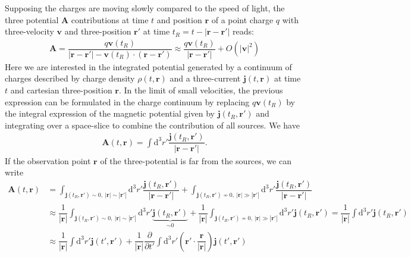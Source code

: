 \documentclass[10pt, a4paper]{article}
\begin{document}
{Supposing the charges are moving slowly compared to the speed of light, the three potential $\mathbf{A}$ contributions at time $t$ and position $\mathbf{r}$ of a point charge $q$ with three-velocity $\mathbf{v}$ and three-position $\mathbf{r}'$ at time $t_R = t-|\mathbf{r} - \mathbf{r}'|$ reads: 
\begin{align*}
   \mathbf{A} =  \dfrac{q \mathbf{v}(t_R)}{|\mathbf{r} - \mathbf{r}'| - \mathbf{v}(t_R) \cdot (\mathbf{r} - \mathbf{r}')} \approx  \dfrac{q \mathbf{v}(t_R)}{|\mathbf{r} - \mathbf{r}'|} + O(|\mathbf{v}|^2)
\end{align*}
Here we are interested in the integrated potential generated by a continuum of charges described by charge density $\rho(t, \mathbf{r})$ and a three-current $\mathbf{j}(t, \mathbf{r})$ at time $t$ and cartesian three-position $\mathbf{r}$. In the limit of small velocities, the previous expression can be formulated in the charge continuum by replacing $q \mathbf{v}(t_R)$ by the integral expression of the magnetic potential given by $\mathbf{j}(t_R, \mathbf{r}')$ and integrating over a space-slice to combine the contribution of all sources. We have 
\begin{align*}
    \mathbf{A}(t, \mathbf{r}) = \int \text{d}^3r' \dfrac{\mathbf{j}(t_R, \mathbf{r}')}{|\mathbf{r} - \mathbf{r}'|}.
\end{align*}
If the observation point $\mathbf{r}$ of the three-potential is far from the sources, we can write 
\begin{align*}
    \mathbf{A}(t, \mathbf{r}) &= \int_{\mathbf{j}(t_R, \mathbf{r}') \sim 0,\ |\mathbf{r}|\sim |\mathbf{r}'|} \text{d}^3r' \dfrac{\mathbf{j}(t_R, \mathbf{r}')}{|\mathbf{r} - \mathbf{r}'|} + \int_{\mathbf{j}(t_R, \mathbf{r}') \not\sim 0,\ |\mathbf{r}|\gg |\mathbf{r}'|} \text{d}^3r' \dfrac{\mathbf{j}(t_R, \mathbf{r}')}{|\mathbf{r} - \mathbf{r}'|} \\&\approx \dfrac{1}{|\mathbf{r}|}\int_{\mathbf{j}(t_R, \mathbf{r}') \sim 0,\ |\mathbf{r}|\sim |\mathbf{r}'|} \text{d}^3r' \underbrace{\mathbf{j}(t_R, \mathbf{r}')}_{\sim 0}+ \dfrac{1}{|\mathbf{r}|}\int_{\mathbf{j}(t_R, \mathbf{r}') \not\sim 0,\ |\mathbf{r}|\gg |\mathbf{r}'|} \text{d}^3r' \mathbf{j}(t_R, \mathbf{r}') =  \dfrac{1}{|\mathbf{r}|} \int \text{d}^3r' \mathbf{j}(t_R, \mathbf{r}')\\
    &\approx \dfrac{1}{|\mathbf{r}|} \int \text{d}^3r' \mathbf{j}(t', \mathbf{r}') + \dfrac{1}{|\mathbf{r}|} \dfrac{\partial}{\partial t'}\int \text{d}^3r' \left(\mathbf{r}' \cdot \dfrac{\mathbf{r}}{|\mathbf{r}|}\right) \mathbf{j}(t', \mathbf{r}')

\end{align*}}
\end{document}
